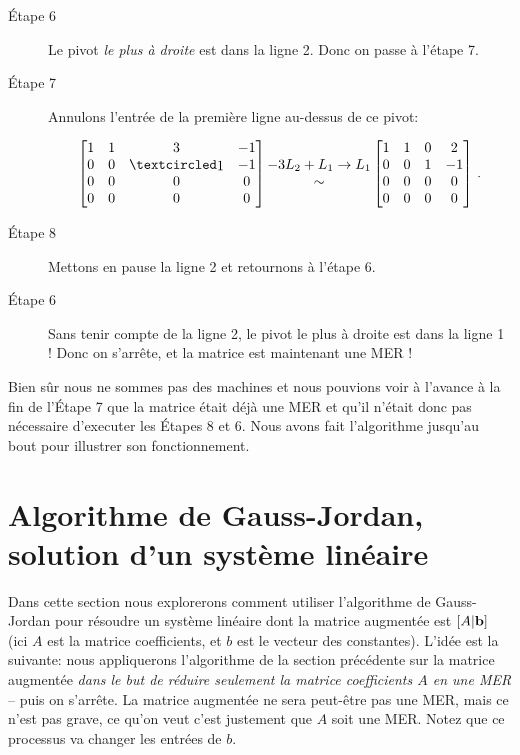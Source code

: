 \begin{myexample}
\begin{description}
\item[Étape 6] Le pivot \emph{le plus à droite} est dans la ligne 2. Donc on passe à l'étape 7.

\item[Étape 7] Annulons l'entr\'ee de la premi\`ere ligne au-dessus de ce pivot:  


$$\mat{ 
1 & 1 & 3 & -1\\ 
0 & 0 & \pivot & -1 \\
0 & 0 & 0 & 0 \\
0 & 0 & 0 & 0}
\begin{matrix}  -3L_2+ L_1\to L_1  \\\sim \end{matrix} 
\mat{ 
1 & 1 & 0 & 2\\ 
0 & 0 & 1 & -1 \\
0 & 0 & 0 & 0 \\
0 & 0 & 0 & 0}\,.$$

\item[Étape 8] Mettons en pause la ligne 2 et retournons à l'étape 6.
\item[Étape 6] Sans tenir compte de la ligne 2, le pivot le plus à droite est dans la ligne 1 ! Donc on s'arrête, et la matrice est maintenant une MER !

\end{description}
Bien sûr nous ne sommes pas des machines et nous pouvions voir à l'avance à la fin de l'Étape 7 que la matrice était déjà une MER et qu'il n'était donc pas nécessaire d'executer les Étapes 8 et 6. Nous avons fait l'algorithme jusqu'au bout pour illustrer son fonctionnement. 
\end{myexample}


\section{Algorithme de Gauss-Jordan, solution d'un syst\`eme lin\'eaire}


Dans cette section nous explorerons comment utiliser l'algorithme de Gauss-Jordan pour résoudre un système linéaire dont la matrice augmentée est $[A|\mathbf{b}]$ (ici $A$ est la matrice coefficients, et $b$ est le vecteur des constantes). L'idée est la suivante:
 nous appliquerons l'algorithme de la section précédente sur la matrice augmentée {\it dans le but de r\'eduire seulement la matrice coefficients $A$ en une MER} -- puis on s'arr\^ete.  La matrice augmentée ne sera peut-être pas une MER, mais ce n'est pas grave, ce qu'on veut c'est justement que $A$ soit une MER. Notez que ce processus va changer les entrées de $b$.\\


